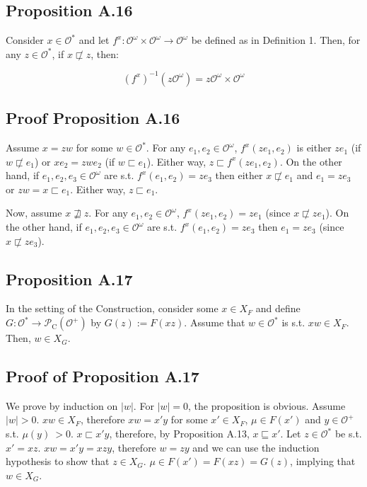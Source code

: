 \documentclass[a4paper]{article}
\newcommand{\Abs}[1]{\lvert #1 \rvert}
\newcommand{\Obs}{\mathcal{O}}
\newcommand{\ObsO}{\Obs^\omega}
\newcommand{\CC}{\mathcal{P}_{\operatorname{C}}}
\begin{document}
\subsection{Proposition A.16}

Consider ${x \in \Obs^*}$ and let ${f^x: \ObsO \times \ObsO \rightarrow \ObsO}$ be defined as in Definition 1. Then, for any ${z \in \Obs^*}$, if ${x \not\sqsubset z}$, then:

$${(f^x)^{-1}(z\ObsO) = z\ObsO \times \ObsO}$$

\subsection{Proof Proposition A.16}

Assume ${x = zw}$ for some ${w \in \Obs^*}$. For any ${e_1,e_2 \in \ObsO}$, ${f^x(ze_1,e_2)}$ is either ${ze_1}$ (if $w \not\sqsubset e_1$) or ${xe_2=zwe_2}$ (if ${w \sqsubset e_1}$). Either way, ${z \sqsubset f^x(ze_1,e_2)}$. On the other hand, if ${e_1,e_2,e_3 \in \ObsO}$ are s.t. ${f^x(e_1,e_2)=ze_3}$ then either ${x \not\sqsubset e_1}$ and ${e_1 = ze_3}$ or ${zw = x \sqsubset e_1}$. Either way, ${z \sqsubset e_1}$.

Now, assume ${x \not\sqsupseteq z}$. For any ${e_1,e_2 \in \ObsO}$, ${f^x(ze_1,e_2)=ze_1}$ (since ${x \not\sqsubset ze_1}$). On the other hand, if ${e_1,e_2,e_3 \in \ObsO}$ are s.t. ${f^x(e_1,e_2)=ze_3}$ then ${e_1 = ze_3}$ (since ${x \not\sqsubset ze_3}$).

\subsection{Proposition A.17}

In the setting of the Construction, consider some ${x \in X_F}$ and define ${G: \Obs^* \rightarrow \CC(\Obs^+)}$ by ${G(z):=F(xz)}$. Assume that ${w \in \Obs^*}$ is s.t. ${xw \in X_F}$. Then, ${w \in X_G}$.

\subsection{Proof of Proposition A.17}

We prove by induction on ${\Abs{w}}$. For ${\Abs{w}=0}$, the proposition is obvious. Assume ${\Abs{w} > 0}$. ${xw \in X_F}$, therefore ${xw=x'y}$ for some ${x' \in X_F}$, ${\mu \in F(x')}$ and ${y \in \Obs^+}$ s.t. ${\mu(y)\ > 0}$. ${x \sqsubset x'y}$, therefore, by Proposition A.13, ${x \sqsubseteq x'}$. Let ${z \in \Obs^*}$ be s.t. ${x' = xz}$. ${xw=x'y=xzy}$, therefore ${w=zy}$ and we can use the induction hypothesis to show that ${z \in X_G}$. ${\mu \in F(x') = F(xz)=G(z)}$, implying that ${w \in X_G}$.
\end{document}

